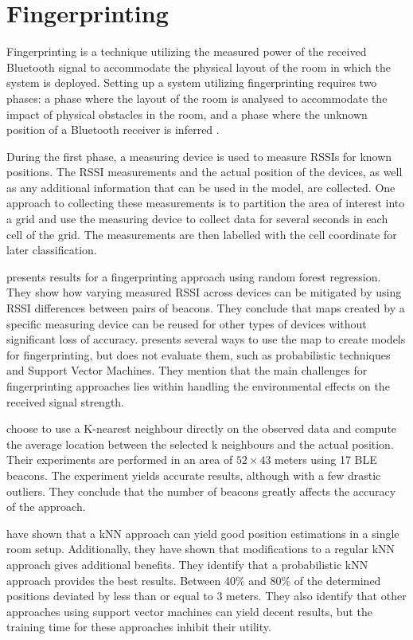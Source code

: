 \section{Fingerprinting}
Fingerprinting is a technique utilizing the measured power of the received Bluetooth signal to accommodate the physical layout of the room in which the system is deployed. 
Setting up a system utilizing fingerprinting requires two phases: a phase where the layout of the room is analysed to accommodate the impact of physical obstacles in the room, and a phase where the unknown position of a Bluetooth receiver is inferred \cite{presence_ble_review, taking_localization_to_the_wild}.

During the first phase, a measuring device is used to measure RSSIs for known positions.
The RSSI measurements and the actual position of the devices, as well as any additional information that can be used in the model, are collected. 
One approach to collecting these measurements is to partition the area of interest into a grid and use the measuring device to collect data for several seconds in each cell of the grid.\cite{improving_indoor_localization}
The measurements are then labelled with the cell coordinate for later classification.

\citeauthor{taking_localization_to_the_wild} \cite{taking_localization_to_the_wild} presents results for a fingerprinting approach using random forest regression.
They show how varying measured RSSI across devices can be mitigated by using RSSI differences between pairs of beacons.
They conclude that maps created by a specific measuring device can be reused for other types of devices without significant loss of accuracy. 
\citeauthor{presence_ble_review}\cite{presence_ble_review} presents several ways to use the map to create models for fingerprinting, but does not evaluate them, such as probabilistic techniques and Support Vector Machines. 
They mention that the main challenges for fingerprinting approaches lies within handling the environmental effects on the received signal strength.

\citeauthor{improving_indoor_localization} \cite{improving_indoor_localization} choose to use a K-nearest neighbour directly on the observed data and compute the average location between the selected k neighbours and the actual position. 
Their experiments are performed in an area of $52\times43$ meters using 17 BLE beacons.
The experiment yields accurate results, although with a few drastic outliers. 
They conclude that the number of beacons greatly affects the accuracy of the approach.

\citeauthor{ble_kneares_neural}\cite{ble_kneares_neural} have shown that a kNN approach can yield good position estimations in a single room setup. 
Additionally, they have shown that modifications to a regular kNN approach gives additional benefits. 
They identify that a probabilistic kNN approach provides the best results. 
Between 40\% and 80\% of the determined positions deviated by less than or equal to 3 meters. 
They also identify that other approaches using support vector machines can yield decent results, but the training time for these approaches inhibit their utility.
